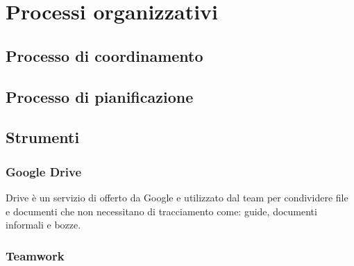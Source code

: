 \documentclass[../NormeDiProgetto.tex]{subfiles}
\begin{document}
	
\section{Processi organizzativi}
	\subsection{Processo di coordinamento}

	\subsection{Processo di pianificazione}
	

	
	\subsection{Strumenti}
		\subsubsection{Google Drive}
		Drive è un servizio di  offerto da Google e utilizzato dal team per condividere file e documenti che non necessitano di tracciamento come: guide, documenti informali e bozze.



	\subsubsection{Teamwork}

	

	
	
\end{document}
